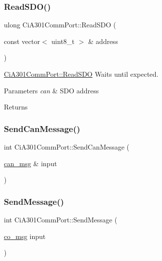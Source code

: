 \subsubsection{\texorpdfstring{Read\+S\+D\+O()}{ReadSDO()}\hspace{0.1cm}{\footnotesize\ttfamily [2/2]}}
{\footnotesize\ttfamily ulong Ci\+A301\+Comm\+Port\+::\+Read\+S\+DO (\begin{DoxyParamCaption}\item[{const vector$<$ uint8\+\_\+t $>$ \&}]{address }\end{DoxyParamCaption})}



\hyperlink{classCiA301CommPort_a0fd0920052684589bc37bb898dcdd758}{Ci\+A301\+Comm\+Port\+::\+Read\+S\+DO} Waits until expected. 


\begin{DoxyParams}{Parameters}
{\em can} & S\+DO address \\
\hline
\end{DoxyParams}
\begin{DoxyReturn}{Returns}

\end{DoxyReturn}
\mbox{\label{classCiA301CommPort_a700a04da67928ca50744617ece28cde5}} 
\subsubsection{\texorpdfstring{Send\+Can\+Message()}{SendCanMessage()}}
{\footnotesize\ttfamily int Ci\+A301\+Comm\+Port\+::\+Send\+Can\+Message (\begin{DoxyParamCaption}\item[{\hyperlink{structcan__msg}{can\+\_\+msg} \&}]{input }\end{DoxyParamCaption})\hspace{0.3cm}{\ttfamily [private]}}

\mbox{\label{classCiA301CommPort_aeae04455e1e1a1ca1beed9478372c031}} 
\subsubsection{\texorpdfstring{Send\+Message()}{SendMessage()}}
{\footnotesize\ttfamily int Ci\+A301\+Comm\+Port\+::\+Send\+Message (\begin{DoxyParamCaption}\item[{\hyperlink{structco__msg}{co\+\_\+msg}}]{input }\end{DoxyParamCaption})\hspace{0.3cm}{\ttfamily [private]}}

